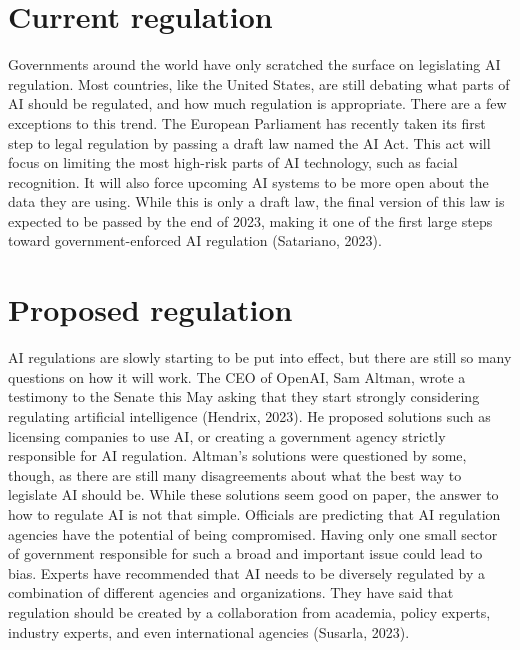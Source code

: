 \documentclass[
]{book}
\begin{document}
\hypertarget{current-regulation}{%
\section{Current regulation}\label{current-regulation}}

Governments around the world have only scratched the surface on legislating AI regulation. Most countries, like the United States, are still debating what parts of AI should be regulated, and how much regulation is appropriate. There are a few exceptions to this trend. The European Parliament has recently taken its first step to legal regulation by passing a draft law named the AI Act. This act will focus on limiting the most high-risk parts of AI technology, such as facial recognition. It will also force upcoming AI systems to be more open about the data they are using. While this is only a draft law, the final version of this law is expected to be passed by the end of 2023, making it one of the first large steps toward government-enforced AI regulation (Satariano, 2023).

\hypertarget{proposed-regulation}{%
\section{Proposed regulation}\label{proposed-regulation}}

AI regulations are slowly starting to be put into effect, but there are still so many questions on how it will work. The CEO of OpenAI, Sam Altman, wrote a testimony to the Senate this May asking that they start strongly considering regulating artificial intelligence (Hendrix, 2023). He proposed solutions such as licensing companies to use AI, or creating a government agency strictly responsible for AI regulation. Altman's solutions were questioned by some, though, as there are still many disagreements about what the best way to legislate AI should be. While these solutions seem good on paper, the answer to how to regulate AI is not that simple. Officials are predicting that AI regulation agencies have the potential of being compromised. Having only one small sector of government responsible for such a broad and important issue could lead to bias. Experts have recommended that AI needs to be diversely regulated by a combination of different agencies and organizations. They have said that regulation should be created by a collaboration from academia, policy experts, industry experts, and even international agencies (Susarla, 2023).
\end{document}

